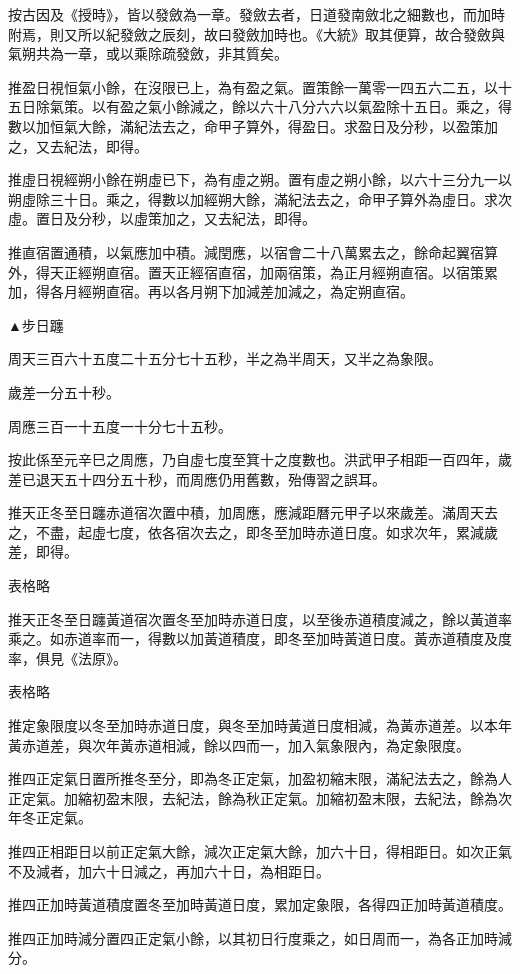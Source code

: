 按古因及《授時》，皆以發斂為一章。發斂去者，日道發南斂北之細數也，而加時附焉，則又所以紀發斂之辰刻，故曰發斂加時也。《大統》取其便算，故合發斂與氣朔共為一章，或以乘除疏發斂，非其質矣。

推盈日視恒氣小餘，在沒限已上，為有盈之氣。置策餘一萬零一四五六二五，以十五日除氣策。以有盈之氣小餘減之，餘以六十八分六六以氣盈除十五日。乘之，得數以加恒氣大餘，滿紀法去之，命甲子算外，得盈日。求盈日及分秒，以盈策加之，又去紀法，即得。

推虛日視經朔小餘在朔虛已下，為有虛之朔。置有虛之朔小餘，以六十三分九一以朔虛除三十日。乘之，得數以加經朔大餘，滿紀法去之，命甲子算外為虛日。求次虛。置日及分秒，以虛策加之，又去紀法，即得。

推直宿置通積，以氣應加中積。減閏應，以宿會二十八萬累去之，餘命起翼宿算外，得天正經朔直宿。置天正經宿直宿，加兩宿策，為正月經朔直宿。以宿策累加，得各月經朔直宿。再以各月朔下加減差加減之，為定朔直宿。

▲步日躔

周天三百六十五度二十五分七十五秒，半之為半周天，又半之為象限。

歲差一分五十秒。

周應三百一十五度一十分七十五秒。

按此係至元辛巳之周應，乃自虛七度至箕十之度數也。洪武甲子相距一百四年，歲差已退天五十四分五十秒，而周應仍用舊數，殆傳習之誤耳。

推天正冬至日躔赤道宿次置中積，加周應，應減距曆元甲子以來歲差。滿周天去之，不盡，起虛七度，依各宿次去之，即冬至加時赤道日度。如求次年，累減歲差，即得。

表格略

推天正冬至日躔黃道宿次置冬至加時赤道日度，以至後赤道積度減之，餘以黃道率乘之。如赤道率而一，得數以加黃道積度，即冬至加時黃道日度。黃赤道積度及度率，俱見《法原》。

表格略

推定象限度以冬至加時赤道日度，與冬至加時黃道日度相減，為黃赤道差。以本年黃赤道差，與次年黃赤道相減，餘以四而一，加入氣象限內，為定象限度。

推四正定氣日置所推冬至分，即為冬正定氣，加盈初縮末限，滿紀法去之，餘為人正定氣。加縮初盈末限，去紀法，餘為秋正定氣。加縮初盈末限，去紀法，餘為次年冬正定氣。

推四正相距日以前正定氣大餘，減次正定氣大餘，加六十日，得相距日。如次正氣不及減者，加六十日減之，再加六十日，為相距日。

推四正加時黃道積度置冬至加時黃道日度，累加定象限，各得四正加時黃道積度。

推四正加時減分置四正定氣小餘，以其初日行度乘之，如日周而一，為各正加時減分。


